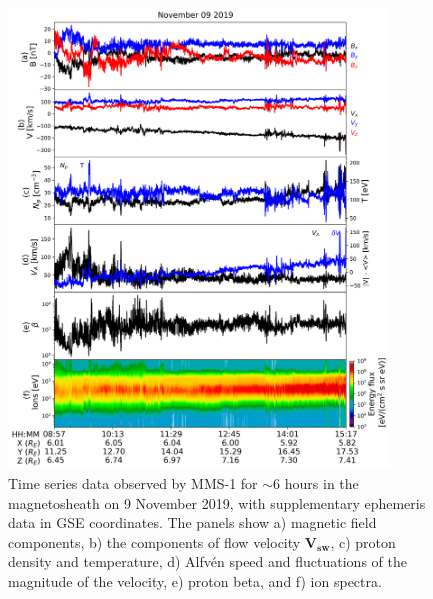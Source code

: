 \begin{figure}
    \centering
    \includegraphics[width=0.9\textwidth]{Figures/Time series/timeseries_09112019_MMS1.png}
    \caption[Time series data observed in the magnetosheath on 9 November 2019]{Time series data observed by MMS-1 for $\sim$6 hours in the magnetosheath on 9 November 2019, with supplementary ephemeris data in \gls{GSE} coordinates. The panels show a) magnetic field components, b) the components of flow velocity $\mathbf{V_{sw}}$, c) proton density and temperature, d) Alfv\'en speed and fluctuations of the magnitude of the velocity, e) proton beta, and f) ion spectra.}
    \label{fig:timeseries-MMS-magnetosheath}
\end{figure}

